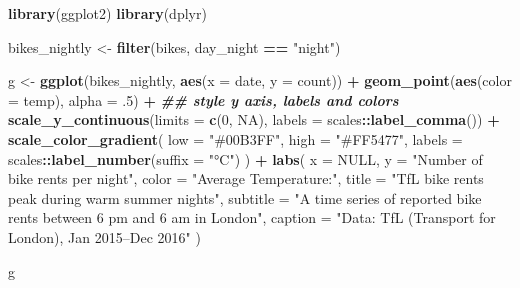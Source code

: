 \documentclass[
]{krantz}
\makeatletter
\newenvironment{Shaded}{\begin{snugshade}}{\end{snugshade}}
\newcommand{\AttributeTok}[1]{\textcolor[rgb]{0.27,0.27,0.27}{#1}}
\newcommand{\ConstantTok}[1]{\textcolor[rgb]{0.37,0.37,0.37}{#1}}
\newcommand{\DecValTok}[1]{\textcolor[rgb]{0.06,0.06,0.06}{#1}}
\newcommand{\DocumentationTok}[1]{\textcolor[rgb]{0.37,0.37,0.37}{\textbf{\textit{#1}}}}
\newcommand{\FunctionTok}[1]{\textcolor[rgb]{0.27,0.27,0.27}{\textbf{#1}}}
\newcommand{\NormalTok}[1]{#1}
\newcommand{\OtherTok}[1]{\textcolor[rgb]{0.37,0.37,0.37}{#1}}
\newcommand{\SpecialCharTok}[1]{\textcolor[rgb]{0.43,0.43,0.43}{\textbf{#1}}}
\newcommand{\StringTok}[1]{\textcolor[rgb]{0.5,0.5,0.5}{#1}}
\newenvironment{kframe}{%
\medskip{}
\setlength{\fboxsep}{.8em}
 \def\at@end@of@kframe{}%
 \ifinner\ifhmode%
  \def\at@end@of@kframe{\end{minipage}}%
  \begin{minipage}{\columnwidth}%
 \fi\fi%
 \def\FrameCommand##1{\hskip\@totalleftmargin \hskip-\fboxsep
 \colorbox{shadecolor}{##1}\hskip-\fboxsep
     \hskip-\linewidth \hskip-\@totalleftmargin \hskip\columnwidth}%
 \MakeFramed {\advance\hsize-\width
   \@totalleftmargin\z@ \linewidth\hsize
   \@setminipage}}%
 {\par\unskip\endMakeFramed%
 \at@end@of@kframe}
\renewenvironment{Shaded}{\begin{kframe}}{\end{kframe}}
\makeatother
\begin{document}
\begin{Shaded}
\begin{Highlighting}[]
\FunctionTok{library}\NormalTok{(ggplot2)}
\FunctionTok{library}\NormalTok{(dplyr)}

\NormalTok{bikes\_nightly }\OtherTok{\textless{}{-}} \FunctionTok{filter}\NormalTok{(bikes, day\_night }\SpecialCharTok{==} \StringTok{"night"}\NormalTok{)}

\NormalTok{g }\OtherTok{\textless{}{-}} 
  \FunctionTok{ggplot}\NormalTok{(bikes\_nightly, }\FunctionTok{aes}\NormalTok{(}\AttributeTok{x =}\NormalTok{ date, }\AttributeTok{y =}\NormalTok{ count)) }\SpecialCharTok{+} 
  \FunctionTok{geom\_point}\NormalTok{(}\FunctionTok{aes}\NormalTok{(}\AttributeTok{color =}\NormalTok{ temp), }\AttributeTok{alpha =}\NormalTok{ .}\DecValTok{5}\NormalTok{) }\SpecialCharTok{+}
  \DocumentationTok{\#\# style y axis, labels and colors}
  \FunctionTok{scale\_y\_continuous}\NormalTok{(}\AttributeTok{limits =} \FunctionTok{c}\NormalTok{(}\DecValTok{0}\NormalTok{, }\ConstantTok{NA}\NormalTok{), }\AttributeTok{labels =}\NormalTok{ scales}\SpecialCharTok{::}\FunctionTok{label\_comma}\NormalTok{()) }\SpecialCharTok{+}
  \FunctionTok{scale\_color\_gradient}\NormalTok{(}
    \AttributeTok{low =} \StringTok{"\#00B3FF"}\NormalTok{, }\AttributeTok{high =} \StringTok{"\#FF5477"}\NormalTok{, }
    \AttributeTok{labels =}\NormalTok{ scales}\SpecialCharTok{::}\FunctionTok{label\_number}\NormalTok{(}\AttributeTok{suffix =} \StringTok{"°C"}\NormalTok{)}
\NormalTok{  ) }\SpecialCharTok{+}
  \FunctionTok{labs}\NormalTok{(}
    \AttributeTok{x =} \ConstantTok{NULL}\NormalTok{, }\AttributeTok{y =} \StringTok{"Number of bike rents per night"}\NormalTok{, }\AttributeTok{color =} \StringTok{"Average Temperature:"}\NormalTok{,}
    \AttributeTok{title =} \StringTok{"TfL bike rents peak during warm summer nights"}\NormalTok{,}
    \AttributeTok{subtitle =} \StringTok{"A time series of reported bike rents between 6 pm and 6 am in London"}\NormalTok{,}
    \AttributeTok{caption =} \StringTok{"Data: TfL (Transport for London), Jan 2015–Dec 2016"}
\NormalTok{  ) }

\NormalTok{g}
\end{Highlighting}
\end{Shaded}
\end{document}
